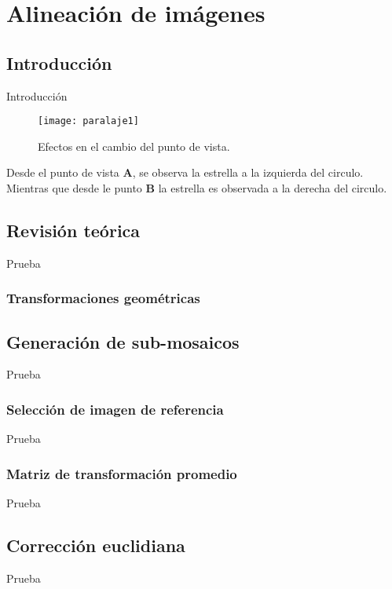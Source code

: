 \chapter{Alineación de imágenes}
\label{capitulo4}

\section{Introducción}

Introducción

\begin{figure}[H]
	\centering
	\texttt{[image: paralaje1]}
	\caption[Paralaje - Efectos en el cambio de punto de vista]{Efectos en el cambio del punto de vista.}
	\label{imagen:paralaje}
\end{figure}

Desde el punto de vista \textbf{A}, se observa la estrella a la izquierda del circulo. Mientras que desde le punto \textbf{B} la estrella es observada a la derecha del circulo.

\section{Revisión teórica}
Prueba

\subsection{Transformaciones geométricas}

\section{Generación de sub-mosaicos}
Prueba

\subsection{Selección de imagen de referencia}
Prueba

\subsection{Matriz de transformación promedio}
Prueba

\section{Corrección euclidiana}
Prueba

